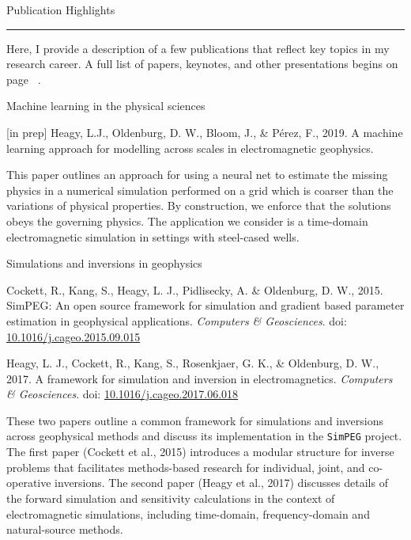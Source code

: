 \documentclass[a4paper, 11pt]{article}
\newcommand{\doi}[1]{doi: \href{https://doi.org/#1}{#1}}
\newcommand{\heading}[1]{
    \begin{minipage}[t]{\textwidth}
    \vspace{0.12cm}
    {\LARGE #1}\\
    \vspace{-0.24cm}
    \hrule
    \end{minipage}
    \vspace{0.05cm}

}
\newcommand{\subheading}[1]{
    \vspace{0.5cm}
    {\Large #1}\\
    \vspace{-0.2cm}
}
\begin{document}

\heading{Publication Highlights}

Here, I provide a description of a few publications that reflect key topics in my research career.
A full list of papers, keynotes, and other presentations begins on page ~\pageref{sec:publications}.

\subheading{Machine learning in the physical sciences}

\begin{myitemize}
    \item{[in prep] Heagy, L.J., Oldenburg, D. W., Bloom, J., \& P\'erez, F., 2019. A machine learning approach for modelling across scales in electromagnetic geophysics.}
\end{myitemize}

This paper outlines an approach for using a neural net to estimate the missing physics in a numerical simulation performed on a grid which is coarser than the variations of physical properties.
By construction, we enforce that the solutions obeys the governing physics.
The application we consider is a time-domain electromagnetic simulation in settings with steel-cased wells.

\subheading{Simulations and inversions in geophysics}

\begin{myitemize}
    \item Cockett, R., Kang, S., Heagy, L. J., Pidlisecky, A. \& Oldenburg, D. W., 2015. SimPEG: An open source framework for simulation and gradient based parameter estimation in geophysical applications. \emph{Computers \& Geosciences}. \doi{10.1016/j.cageo.2015.09.015}
    \item Heagy, L. J., Cockett, R., Kang, S., Rosenkjaer, G. K., \& Oldenburg, D. W., 2017. A framework for simulation and inversion in electromagnetics. \emph{Computers \& Geosciences}. \linebreak \doi{10.1016/j.cageo.2017.06.018}
\end{myitemize}

These two papers outline a common framework for simulations and inversions across geophysical methods and discuss its implementation in the \texttt{SimPEG} project. The first paper (Cockett et al., 2015) introduces a modular structure for inverse problems that facilitates methods-based research for individual, joint, and co-operative inversions.
The second paper (Heagy et al., 2017) discusses details of the forward simulation and sensitivity calculations in the context of electromagnetic simulations, including time-domain, frequency-domain and natural-source methods.
\end{document}
